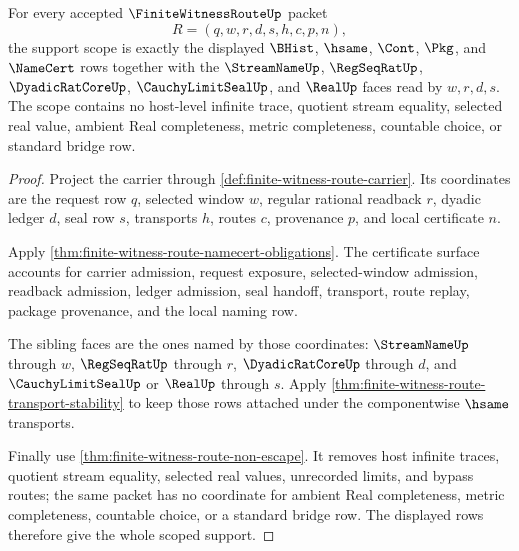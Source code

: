 \begin{theorem}
\label{thm:finite-witness-route-scoped-support-rows}
For every accepted $\FiniteWitnessRouteUp$ packet
$$
R=(q,w,r,d,s,h,c,p,n),
$$
the support scope is exactly the displayed $\BHist$, $\hsame$, $\Cont$, $\Pkg$, and $\NameCert$ rows together with the $\StreamNameUp$, $\RegSeqRatUp$, $\DyadicRatCoreUp$, $\CauchyLimitSealUp$, and $\RealUp$ faces read by $w,r,d,s$. The scope contains no host-level infinite trace, quotient stream equality, selected real value, ambient Real completeness, metric completeness, countable choice, or standard bridge row.
\end{theorem}
\begin{proof}
Project the carrier through \autoref{def:finite-witness-route-carrier}. Its coordinates are the request row $q$, selected window $w$, regular rational readback $r$, dyadic ledger $d$, seal row $s$, transports $h$, routes $c$, provenance $p$, and local certificate $n$.

Apply \autoref{thm:finite-witness-route-namecert-obligations}. The certificate surface accounts for carrier admission, request exposure, selected-window admission, readback admission, ledger admission, seal handoff, transport, route replay, package provenance, and the local naming row.

The sibling faces are the ones named by those coordinates: $\StreamNameUp$ through $w$, $\RegSeqRatUp$ through $r$, $\DyadicRatCoreUp$ through $d$, and $\CauchyLimitSealUp$ or $\RealUp$ through $s$. Apply \autoref{thm:finite-witness-route-transport-stability} to keep those rows attached under the componentwise $\hsame$ transports.

Finally use \autoref{thm:finite-witness-route-non-escape}. It removes host infinite traces, quotient stream equality, selected real values, unrecorded limits, and bypass routes; the same packet has no coordinate for ambient Real completeness, metric completeness, countable choice, or a standard bridge row. The displayed rows therefore give the whole scoped support.
\end{proof}

